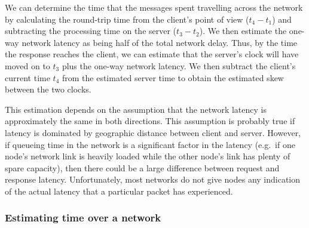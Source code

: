 We can determine the time that the messages spent travelling across the network by calculating the round-trip time from the client's point of view ($t_4 - t_1$) and subtracting the processing time on the server ($t_3 - t_2$).
We then estimate the one-way network latency as being half of the total network delay.
Thus, by the time the response reaches the client, we can estimate that the server's clock will have moved on to $t_3$ plus the one-way network latency.
We then subtract the client's current time $t_4$ from the estimated server time to obtain the estimated skew between the two clocks.

This estimation depends on the assumption that the network latency is approximately the same in both directions.
This assumption is probably true if latency is dominated by geographic distance between client and server.
However, if queueing time in the network is a significant factor in the latency (e.g.\ if one node's network link is heavily loaded while the other node's link has plenty of spare capacity), then there could be a large difference between request and response latency.
Unfortunately, most networks do not give nodes any indication of the actual latency that a particular packet has experienced.

\begin{frame}
    \label{s:ntp-calculation}
    \frametitle{Estimating time over a network}
    \begin{center}
    \end{center}
\end{frame}
\label{l:ntp-calculation}

